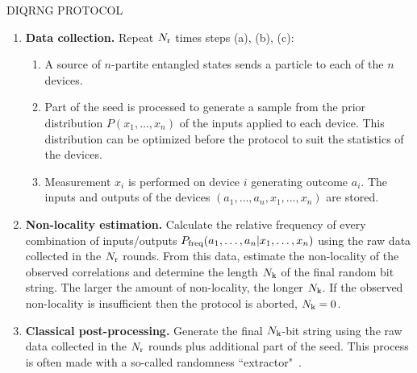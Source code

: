 \documentclass[11pt,a4paper]{article}
\begin{document}
\begin{framed}
\noindent
DIQRNG PROTOCOL
\begin{enumerate}

  \item {\bf Data collection.} Repeat $N_{\rm r}$ times steps (a), (b), (c):
  \begin{enumerate}

  \item A source of $n$-partite entangled states sends a particle to each of the $n$ devices.

  \item Part of the seed is processed to generate a sample from the prior distribution $P (x_1, \ldots, x_n)$ of the inputs applied to each device.
  This distribution can be optimized before the protocol to suit the statistics of the devices.

  \item Measurement $x_i$ is performed on device $i$ generating outcome $a_i$.
  The inputs and outputs of the devices $(a_1, \ldots, a_n, x_1, \ldots, x_n)$ are stored.
  \end{enumerate}

  \item {\bf Non-locality estimation.}
  Calculate the relative frequency of every combination of inputs/outputs $P_{\rm freq} (a_1, \ldots, a_n| x_1, \ldots, x_n)$ using the raw data collected in the $N_{\rm r}$ rounds.
  From this data, estimate the %
non-locality of the observed correlations and determine the length $N_{\rm k}$ of the final random bit string. The larger the amount of non-locality, the longer $N_{\rm k}$.
If the observed non-locality is insufficient then the protocol is aborted, $N_{\rm k} =0$.

  \item {\bf Classical post-processing.} Generate the final $N_{\rm k}$-bit string using the raw data collected in the $N_{\rm r}$ rounds plus additional part of the seed. This process is often made with a so-called randomness ``extractor"~\cite{randextr,randextr2}.
\end{enumerate}
\end{framed}
\end{document}
